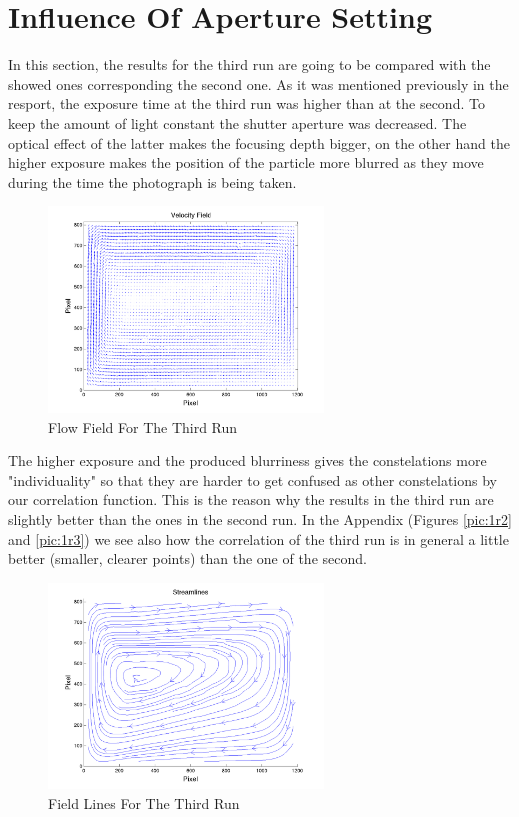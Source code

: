 \section{Influence Of Aperture Setting}

In this section, the results for the third run are going to be compared with the showed ones corresponding the second one. As it was mentioned previously in the resport, the exposure time at the third run was higher than at the second. To keep the amount of light constant the shutter aperture was decreased. The optical effect of the latter makes the focusing depth bigger, on the other hand the higher exposure makes the position of the particle more blurred as they move during the time the photograph is being taken.\\



\begin{figure}[H]
\centering
\includegraphics[width=0.65\textwidth]{pics/figure2_run3.png}
\caption{Flow Field For The Third Run}
\label{pic:2r3}
\end{figure}

The higher exposure and the produced blurriness gives the constelations more "individuality" so that they are harder to get confused as other constelations by our correlation function. This is the reason why the results in the third run are slightly better than the ones in the second run. In the Appendix (Figures \ref{pic:1r2} and \ref{pic:1r3}) we see also how the correlation of the third run is in general a little better (smaller, clearer points) than the one of the second.


\begin{figure}[H]
\centering
\includegraphics[width=0.65\textwidth]{pics/figure3_run3.png}
\caption{Field Lines For The Third Run}
\label{pic:3r3}
\end{figure}

